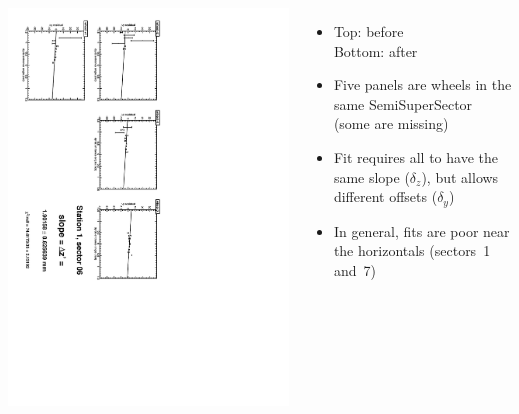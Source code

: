 \documentclass[compress]{beamer}
\begin{document}
\begin{frame}
\begin{columns}
\vfill
\includegraphics[height=\linewidth, angle=90]{zfits_after/zfit_1_06.pdf}
\begin{itemize}
\item Top: before \\ Bottom: after
\item Five panels are wheels in the same SemiSuperSector (some are missing)
\item Fit requires all to have the same slope ($\delta_z$), but allows different offsets ($\delta_y$)
\item In general, fits are poor near the horizontals (sectors~1 and~7)
\end{itemize}
\end{columns}
\end{frame}
\end{document}
